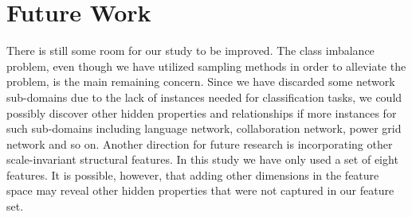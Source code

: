 \documentclass{article}
\begin{document}
\section{Future Work}
There is still some room for our study to be improved. The class imbalance problem, even though we have utilized sampling methods in order to alleviate the problem, is the main remaining concern. Since we have discarded some network sub-domains due to the lack of instances needed for classification tasks, we could possibly discover other hidden properties and relationships if more instances for such sub-domains including language network, collaboration network, power grid network and so on. Another direction for future research is incorporating other scale-invariant structural features. In this study we have only used a set of eight features. It is possible, however, that adding other dimensions in the feature space may reveal other hidden properties that were not captured in our feature set.

\clearpage


 
\end{document}
